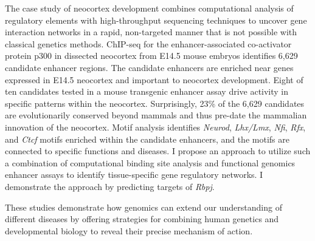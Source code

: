 The case study of neocortex development combines computational analysis of
regulatory elements with high-throughput sequencing techniques to uncover
gene interaction networks in a rapid, non-targeted manner that is not
possible with classical genetics methods.  ChIP-seq for the enhancer-associated
co-activator protein p300 in dissected neocortex from E14.5 mouse embryos
identifies 6,629 candidate enhancer regions.  The candidate enhancers are
enriched near genes expressed in E14.5 neocortex and important to neocortex development.
Eight of ten candidates tested in a mouse transgenic enhancer assay drive activity in
specific patterns within the neocortex.  Surprisingly, 23\% of the 6,629 candidates
are evolutionarily conserved beyond mammals and thus pre-date the mammalian innovation of
the neocortex.  Motif analysis identifies \textit{Neurod}, \textit{Lhx/Lmx}, \textit{Nfi},
\textit{Rfx}, and \textit{Ctcf}
motifs enriched within the candidate enhancers, and the motifs are connected to specific
functions and diseases.  I propose an approach to utilize such a combination of
computational binding site analysis and functional genomics enhancer assays
to identify tissue-specific gene regulatory networks.  I demonstrate the approach by
predicting targets of \textit{Rbpj}.
%

These studies demonstrate how genomics can extend our understanding of different diseases by offering strategies for combining human genetics and developmental biology to reveal their precise mechanism of action.
